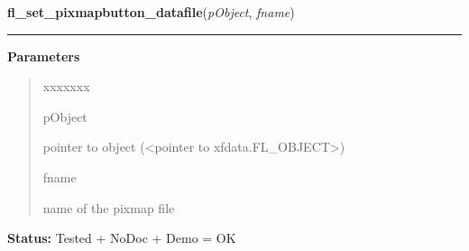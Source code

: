 \hspace{.8\funcindent}\begin{boxedminipage}{\funcwidth}

    \raggedright \textbf{fl\_set\_pixmapbutton\_datafile}(\textit{pObject}, \textit{fname})

    \vspace{-1.5ex}

    \rule{\textwidth}{0.5\fboxrule}
\setlength{\parskip}{2ex}
\setlength{\parskip}{1ex}
      \textbf{Parameters}
      \vspace{-1ex}

      \begin{quote}
        \begin{Ventry}{xxxxxxx}

          \item[pObject]

          pointer to object ({\textless}pointer to 
          xfdata.FL\_OBJECT{\textgreater})

          \item[fname]

          name of the pixmap file

        \end{Ventry}

      \end{quote}

\textbf{Status:} Tested + NoDoc + Demo = OK



    \end{boxedminipage}

    \label{xformslib:library:fl_set_pixmap_align}

    \vspace{0.5ex}

